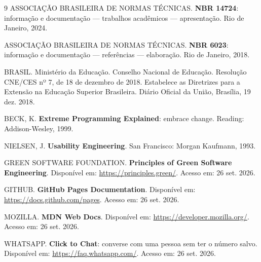 \documentclass[12pt,a4paper]{article}
\begin{document}
\begin{thebibliography}{9}
 ASSOCIAÇÃO BRASILEIRA DE NORMAS TÉCNICAS. \textbf{NBR 14724}: informação e documentação --- trabalhos acadêmicos --- apresentação. Rio de Janeiro, 2024.

 ASSOCIAÇÃO BRASILEIRA DE NORMAS TÉCNICAS. \textbf{NBR 6023}: informação e documentação --- referências --- elaboração. Rio de Janeiro, 2018.

 BRASIL. Ministério da Educação. Conselho Nacional de Educação. Resolução CNE/CES nº 7, de 18 de dezembro de 2018. Estabelece as Diretrizes para a Extensão na Educação Superior Brasileira. Diário Oficial da União, Brasília, 19 dez. 2018.

 BECK, K. \textbf{Extreme Programming Explained}: embrace change. Reading: Addison-Wesley, 1999.

 NIELSEN, J. \textbf{Usability Engineering}. San Francisco: Morgan Kaufmann, 1993.

 GREEN SOFTWARE FOUNDATION. \textbf{Principles of Green Software Engineering}. Disponível em: \url{https://principles.green/}. Acesso em: 26 set. 2026.

 GITHUB. \textbf{GitHub Pages Documentation}. Disponível em: \url{https://docs.github.com/pages}. Acesso em: 26 set. 2026.

 MOZILLA. \textbf{MDN Web Docs}. Disponível em: \url{https://developer.mozilla.org/}. Acesso em: 26 set. 2026.

 WHATSAPP. \textbf{Click to Chat}: converse com uma pessoa sem ter o número salvo. Disponível em: \url{https://faq.whatsapp.com/}. Acesso em: 26 set. 2026.
\end{thebibliography}
\end{document}
